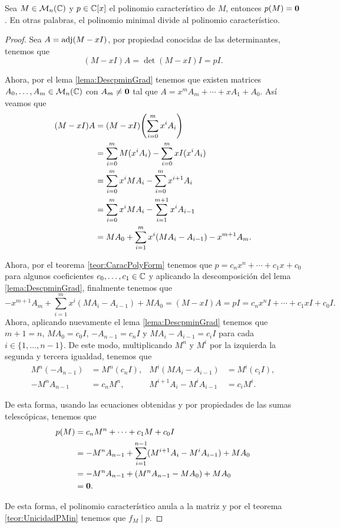 \begin{teor}
  Sea $M \in \mathcal{M}_n(\mathbb{C})$ y $p \in \mathbb{C}[x]$ el polinomio característico de $M$, entonces $p(M) = \mathbf{0}$. En otras palabras, el polinomio minimal divide al polinomio característico.
\end{teor}
\begin{proof}
  Sea $A = \operatorname{adj}(M-xI)$, por propiedad conocidas de las determinantes, tenemos que
    \[ (M-xI)A = \det(M-xI) I = p I. \]
  
  Ahora, por el lema \ref{lema:DescpminGrad} tenemos que existen matrices $A_0,\ldots,A_m \in \mathcal{M}_n(\mathbb{C})$ con $A_m \neq \mathbf{0}$ tal que $A = x^m A_m + \cdots + xA_1 + A_0$. Así veamos que
  \begin{align*}
    (M-xI)A &= (M-xI) \paren{ \sum_{i=0}^m x^i A_i } \\
      &= \sum_{i=0}^m M(x^i A_i) - \sum_{i=0}^m xI(x^i A_i) \\
      &= \sum_{i=0}^m x^i M A_i  - \sum_{i=0}^m x^{i+1} A_i \\
      &= \sum_{i=0}^m x^i M A_i  - \sum_{i=1}^{m+1} x^i A_{i-1} \\
      &= MA_0 +  \sum_{i=1}^m x^i( M A_i  - A_{i-1})  - x^{m+1}A_m.
  \end{align*}

  Ahora, por el teorema \ref{teor:CaracPolyForm} tenemos que $p = c_n x^n + \cdots + c_1 x + c_0 $ para algunos coeficientes $c_0,\ldots,c_1 \in \mathbb{C}$ y aplicando la descomposición del lema \ref{lema:DescpminGrad}, finalmente tenemos que
  \[
    - x^{m+1}A_m +  \sum_{i=1}^m x^i( M A_i  - A_{i-1})  + MA_0 = (M-xI)A = pI = c_n x^n I + \cdots + c_1 x I + c_0 I.
  \]
  Ahora, aplicando nuevamente el lema \ref{lema:DescpminGrad} tenemos que $m+1 = n$, $MA_0 =  c_0 I$, $-A_{n-1} = c_n I$ y $M A_i  - A_{i-1} = c_i I$ para cada $i \in \{1,\ldots,n-1\}$. De este modo, multiplicando $M^n$ y $M^i$ por la izquierda la segunda y tercera igualdad, tenemos que
  \begin{align*}
    M^n(-A_{n-1}) &= M^n(c_n I),  &  M^i(M A_i  - A_{i-1}) &= M^i(c_i I),   \\
    -M^nA_{n-1} &= c_n M^n,  &  M^{i+1} A_i  - M^iA_{i-1} &= c_i M^i .
  \end{align*}

  De esta forma, usando las ecuaciones obtenidas y por propiedades de las sumas telescópicas, tenemos que
  \begin{align*}
    p(M) &= c_n M^n + \cdots + c_1M + c_0 I \\
      &= -M^nA_{n-1} + \sum_{i=1}^{n-1} (M^{i+1} A_i  - M^iA_{i-1}) + MA_0  \\
      &= -M^nA_{n-1} + (M^n A_{n-1}  - MA_0) + MA_0  \\
      &= \mathbf{0}. \\
  \end{align*}

  De esta forma, el polinomio característico anula a la matriz y por el teorema \ref{teor:UnicidadPMin} tenemos que $f_M \mid p$.
\end{proof}

